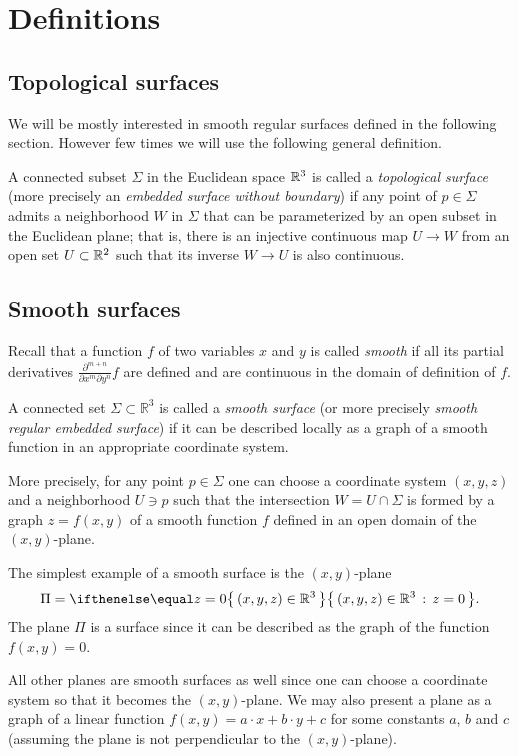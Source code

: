\chapter{Definitions}

\section{Topological surfaces}

We will be mostly interested in smooth regular surfaces defined in the following section.
However few times we will use the following general definition.

A connected subset $\Sigma$ in the Euclidean space $\mathbb{R}^3$
is called a \emph{topological surface} (more precisely an \emph{embedded surface without boundary}) 
if any point of $p\in \Sigma$ admits a neighborhood $W$ in $\Sigma$ 
that can be parameterized by an open subset in the Euclidean plane; %
that is, there is an injective continuous map $U\to W$ from an open set $U\subset \mathbb{R}^2$ such that its inverse $W\to U$ is also continuous.


\section{Smooth surfaces}

Recall that a function $f$ of two variables $x$ and $y$ is called \emph{smooth} if all its partial derivatives $\frac{\partial^{m+n}}{\partial x^m\partial y^n}f$ are defined and are continuous in the domain of definition of $f$. 

A connected set $\Sigma \subset \mathbb{R}^3$ is called a \emph{smooth surface} (or more precisely \emph{smooth regular embedded surface}) if it can be described locally as a graph of a smooth function in an appropriate coordinate system.\label{page:def-smooth-surface} %

More precisely, for any point $p\in \Sigma$ one can choose a coordinate system $(x,y,z)$ and a neighborhood $U\ni p$ such that
the intersection $W=U\cap \Sigma$ is formed by a graph $z=f(x,y)$ of a smooth function $f$ defined in an open domain of the $(x,y)$-plane.

The simplest example of a smooth surface is the $(x,y)$-plane 
\[\Pi=\set{(x,y,z)\in\RR^3}{z=0}.\]
The plane $\Pi$ is a surface since
it can be described as the graph of the function $f(x,y)=0$.

All other planes are smooth surfaces as well since one can choose a coordinate system so that it becomes the $(x,y)$-plane.
We may also present a plane as a graph of a linear function 
$f(x,y)=a\cdot x+b\cdot y+c$ for some constants $a$, $b$ and $c$
(assuming the plane is not perpendicular to the $(x,y)$-plane).

